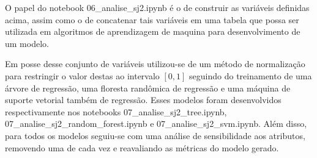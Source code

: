 O papel do notebook 06\_analise\_sj2.ipynb é o de construir as variáveis definidas acima, assim como o de concatenar tais variáveis em uma tabela que possa ser utilizada em algoritmos de aprendizagem de maquina para desenvolvimento de um modelo.

Em posse desse conjunto de variáveis utilizou-se de um método de normalização para restringir o valor destas ao intervalo $[0,1]$ seguindo do treinamento de uma árvore de regressão, uma floresta randômica de regressão e uma máquina de suporte vetorial também de regressão. Esses modelos foram desenvolvidos respectivamente nos notebooks 07\_analise\_sj2\_tree.ipynb, 07\_analise\_sj2\_random\_forest.ipynb e 07\_analise\_sj2\_svm.ipynb. Além disso, para todos os modelos seguiu-se com uma análise de sensibilidade aos atributos, removendo uma de cada vez e reavaliando as métricas do modelo gerado.
